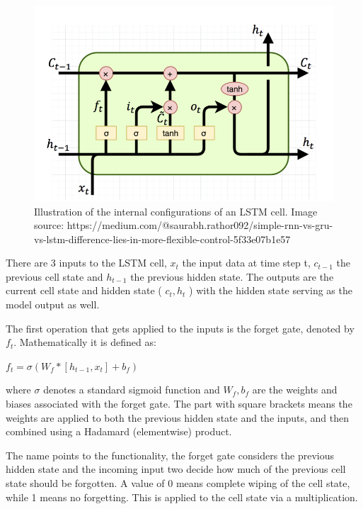 \documentclass[bsc,frontabs,singlespacing,parskip,deptreport]{infthesis}
\begin{document}
\begin{figure}
\centering
\includegraphics[width = 6in]{lstm}
\setlength{\belowcaptionskip}{0pt}
\caption{Illustration of the internal configurations of an LSTM cell. Image source: https://medium.com/@saurabh.rathor092/simple-rnn-vs-gru-vs-lstm-difference-lies-in-more-flexible-control-5f33e07b1e57}
\label{lstm}
\vskip -5mm
\end{figure}


There are 3 inputs to the LSTM cell, $ x_t $ the input data at time step t,  $ c_{t-1} $ the previous cell state and $ h_{t-1} $ the previous hidden state. The outputs are the current cell state and hidden state ( $ c_t, h_t $ ) with the hidden state serving as the model output as well.

The first operation that gets applied to the inputs is the forget gate, denoted by $ f_t $. Mathematically it is defined as:

\begin{center}
$ f_t = \sigma(W_f*[h_{t-1},x_t] + b_f) $
\end{center}

where $ \sigma $ denotes a standard sigmoid function and $ W_f, b_f $ are the weights and biases associated with the forget gate. The part with square brackets means the weights are applied to both the previous hidden state and the inputs, and then combined using a Hadamard (elementwise) product.

The name points to the functionality, the forget gate considers the previous hidden state and the incoming input two decide how much of the previous cell state should be forgotten. A value of 0 means complete wiping of the cell state, while 1 means no forgetting. This is applied to the cell state via a multiplication.
\end{document}
